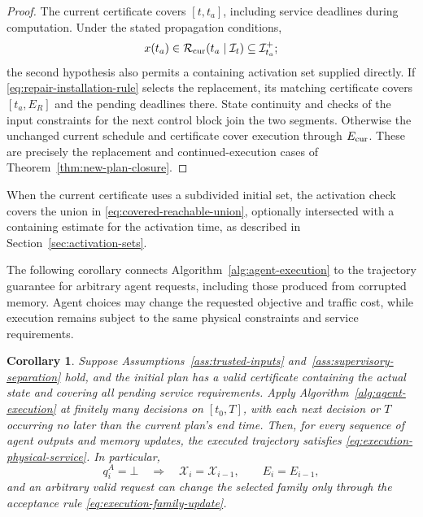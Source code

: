 \documentclass[final]{cas-sc}
\theoremstyle{definition}
\theoremstyle{plain}
\newtheorem{corollary}{Corollary}
\theoremstyle{definition}
\theoremstyle{plain}
\begin{document}
\begin{proof}
The current certificate covers $[t,t_a]$, including service deadlines
during computation. Under the stated propagation conditions,
\[
x(t_a)\in\mathcal R_{\rm cur}(t_a\mid\mathcal I_t)
\subseteq\mathcal I_{t_a}^{+};
\]
the second hypothesis also permits a containing activation set supplied
directly. If \eqref{eq:repair-installation-rule} selects the replacement, its
matching certificate covers $[t_a,E_R]$ and the pending deadlines
there. State continuity and checks of the input constraints for the
next control block join the two segments. Otherwise the unchanged
current schedule and certificate cover execution through
$E_{\rm cur}$. These are precisely the replacement and
continued-execution cases of Theorem~\ref{thm:new-plan-closure}.
\end{proof}

When the current certificate uses a subdivided initial set, the
activation check covers the union in \eqref{eq:covered-reachable-union},
optionally intersected with a containing estimate for the activation
time, as described in Section~\ref{sec:activation-sets}.

The following corollary connects
Algorithm~\ref{alg:agent-execution} to the trajectory guarantee for
arbitrary agent requests, including those produced from corrupted
memory. Agent choices may change the requested objective and traffic
cost, while execution remains subject to the same physical constraints
and service requirements.

\begin{corollary}
\label{cor:agent-independent-execution}
Suppose Assumptions~\ref{ass:trusted-inputs} and~\ref{ass:supervisory-separation}
hold, and the initial plan has a valid certificate containing the
actual state and covering all pending service requirements. Apply
Algorithm~\ref{alg:agent-execution} at finitely many decisions on
$[t_0,T]$, with each next decision or $T$ occurring no later than the
current plan's end time. Then, for every sequence of agent outputs and
memory updates, the executed trajectory satisfies
\eqref{eq:execution-physical-service}. In particular,
\[
q_i^{A}=\bot\quad\Longrightarrow\quad
\mathcal X_i=\mathcal X_{i-1},\qquad E_i=E_{i-1},
\]
and an arbitrary valid request can change the selected family only
through the acceptance rule \eqref{eq:execution-family-update}.
\end{corollary}
\end{document}

